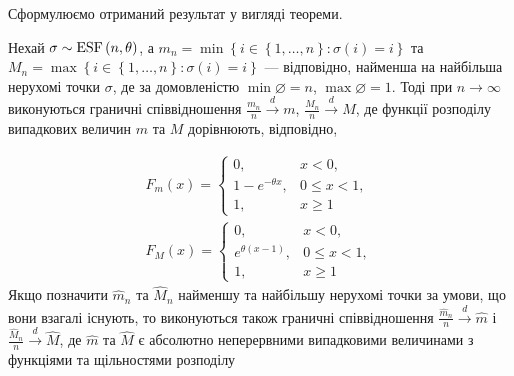 Сформулюємо отриманий результат у вигляді теореми.
\begin{theorem}\label{th:min_max_limit}
    Нехай $\sigma \sim \mathrm{ESF}\left(n, \theta\right)$, а 
    $m_n = \min\left\{i\in \left\{1,\dots,n\right\}: \sigma(i) = i\right\}$
    та $M_n = \max\left\{i\in \left\{1,\dots,n\right\}: \sigma(i) = i\right\}$ --- відповідно,
    найменша на найбільша нерухомі точки $\sigma$, де за домовленістю
    $\min \varnothing = n$, $\max \varnothing = 1$. Тоді при $n\to\infty$ виконуються граничні
    співвідношення
    $\frac{m_n}{n} \overset{d}{\longrightarrow} m$, $\frac{M_n}{n} \overset{d}{\longrightarrow} M$,
    де функції розподілу випадкових величин $m$ та $M$ дорівнюють, відповідно,

    \begin{gather}
        F_m(x) = \begin{cases}
            0, & x < 0, \\
            1 - e^{-\theta x}, & 0 \leq x < 1, \\
            1, & x \geq 1
        \end{cases} \\
        F_M(x) = \begin{cases}
            0, & x < 0, \\
            e^{\theta(x - 1)}, & 0 \leq x < 1, \\
            1, & x \geq 1
        \end{cases}
    \end{gather}
    Якщо позначити $\widehat{m}_n$ та $\widehat{M}_n$ найменшу та найбільшу нерухомі точки
    за умови, що вони взагалі існують, то виконуються також граничні співвідношення
    $\frac{\widehat{m}_n}{n} \overset{d}{\longrightarrow} \widehat{m}$ і
    $\frac{\widehat{M}_n}{n} \overset{d}{\longrightarrow} \widehat{M}$, де
    $\widehat{m}$ та $\widehat{M}$ є абсолютно неперервними випадковими величинами
    з функціями та щільностями розподілу


\end{theorem}
